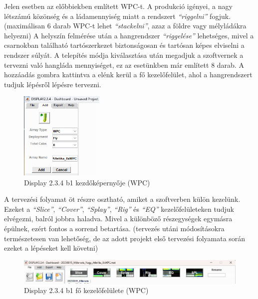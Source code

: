 Jelen esetben az előbbiekben említett WPC-t. A produkció igényei, a nagy létszámú közönség és a ládamennyiség miatt a rendszert
\textit{``riggelni''} fogjuk. (maximálisan 6 darab WPC-t lehet \textit{``stackelni''}, azaz a földre vagy mélyládákra helyezni)
A helyszín felmérése után a hangrendszer \textit{``riggelése''} lehetséges, mivel a csarnokban található tartószerkezet biztonságosan
és tartósan képes elviselni a rendszer súlyát.
A telepítés módja kiválasztása után megadjuk a szoftvernek a tervezni való hangláda mennyiséget, ez az esetünkben már említett 8 darab.
A hozzáadás gombra kattintva a elénk kerül a fő kezelőfelület, ahol a hangrendszert tudjuk lépésről lépésre tervezni.
\begin{figure}[H]
	\centering
	\includegraphics[width=40mm, keepaspectratio]{figures/display_wpc_0.png}
	\caption{Display 2.3.4 b1 kezdőképernyője (WPC)}\label{fig:display_wpc_0}
\end{figure}
A tervezési folyamat öt részre osztható, amiket a szoftverben külön kezelünk.
Ezeket a \textit{``Slice''}, \textit{``Cover''}, \textit{``Splay''}, \textit{``Rig''} és \textit{``EQ''} kezelőfelületeken tudjuk elvégezni,
balról jobbra haladva. Mivel a különböző részegységek egymásra épülnek, ezért fontos a sorrend betartása.
(tervezés utáni módosításokra természetesen van lehetőség, de az adott projekt első tervezési folyamata során ezeket a lépéseket kell követni)
\begin{figure}[H]
	\centering
	\includegraphics[width=\textwidth, keepaspectratio]{figures/display_wpc_0_1.png}
	\caption{Display 2.3.4 b1 fő kezelőfelülete (WPC)}\label{fig:display_wpc_0_1}
\end{figure}
